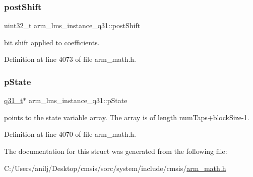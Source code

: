 \subsubsection{\texorpdfstring{post\+Shift}{postShift}}
{\footnotesize\ttfamily uint32\+\_\+t arm\+\_\+lms\+\_\+instance\+\_\+q31\+::post\+Shift}

bit shift applied to coefficients. 

Definition at line 4073 of file arm\+\_\+math.\+h.

\mbox{\label{structarm__lms__instance__q31_a206d47b49de6f357f933ebe61520753c}} 
\subsubsection{\texorpdfstring{p\+State}{pState}}
{\footnotesize\ttfamily \hyperlink{arm__math_8h_adc89a3547f5324b7b3b95adec3806bc0}{q31\+\_\+t}$\ast$ arm\+\_\+lms\+\_\+instance\+\_\+q31\+::p\+State}

points to the state variable array. The array is of length num\+Taps+block\+Size-\/1. 

Definition at line 4070 of file arm\+\_\+math.\+h.



The documentation for this struct was generated from the following file\+:\begin{DoxyCompactItemize}
\item 
C\+:/\+Users/anilj/\+Desktop/cmsis/sorc/system/include/cmsis/\hyperlink{arm__math_8h}{arm\+\_\+math.\+h}\end{DoxyCompactItemize}
